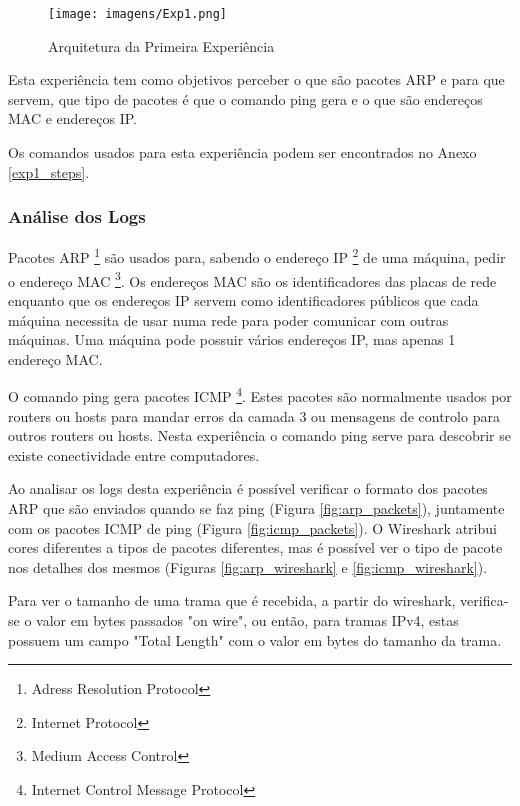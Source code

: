 \begin{figure}[h!]
\centering
\texttt{[image: imagens/Exp1.png]}
\caption{Arquitetura da Primeira Experiência}
\label{fig:exp1}
\end{figure}

Esta experiência tem como objetivos perceber o que são pacotes ARP e para que servem, que tipo de pacotes é que o comando ping gera e o que são endereços MAC e endereços IP.

Os comandos usados para esta experiência podem ser encontrados no Anexo \ref{exp1_steps}.
\subsubsection{Análise dos Logs}

Pacotes ARP \footnote{Adress Resolution Protocol} são usados para, sabendo o endereço IP \footnote{Internet Protocol} de uma máquina, pedir o endereço MAC \footnote{Medium Access Control}. Os endereços MAC são os identificadores das placas de rede enquanto que os endereços IP servem como identificadores públicos que cada máquina necessita de usar numa rede para poder comunicar com outras máquinas. Uma máquina pode possuir vários endereços IP, mas apenas 1 endereço MAC.

O comando ping gera pacotes ICMP \footnote{Internet Control Message Protocol}. Estes pacotes são normalmente usados por routers ou hosts para mandar erros da camada 3 ou mensagens de controlo para outros routers ou hosts. Nesta experiência o comando ping serve para descobrir se existe conectividade entre computadores.

Ao analisar os logs desta experiência é possível verificar o formato dos pacotes ARP que são enviados quando se faz ping (Figura \ref{fig:arp_packets}), juntamente com os pacotes ICMP de ping (Figura \ref{fig:icmp_packets}). O Wireshark atribui cores diferentes a tipos de pacotes diferentes, mas é possível ver o tipo de pacote nos detalhes dos mesmos (Figuras \ref{fig:arp_wireshark} e \ref{fig:icmp_wireshark}).

Para ver o tamanho de uma trama que é recebida, a partir do wireshark, verifica-se o valor em bytes passados "on wire", ou então, para tramas IPv4, estas possuem um campo "Total Length" com o valor em bytes do tamanho da trama.